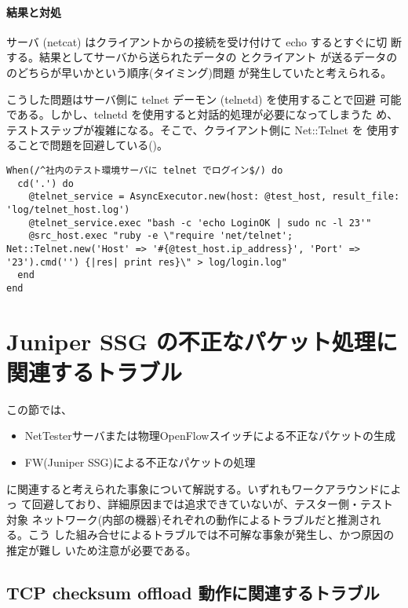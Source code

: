     \paragraph{結果と対処}
サーバ (netcat) はクライアントからの接続を受け付けて echo するとすぐに切
断する。結果としてサーバから送られたデータの  とクライアント
が送るデータの  のどちらが早いかという順序(タイミング)問題
が発生していたと考えられる。

こうした問題はサーバ側に telnet デーモン (telnetd) を使用することで回避
可能である。しかし、telnetd を使用すると対話的処理が必要になってしまうた
め、テストステップが複雑になる。そこで、クライアント側に Net::Telnet を
使用することで問題を回避している()。

\begin{lstlisting}[caption=修正後テストステップ,label=lst:telnet-step-new,linebackgroundcolor={\ifnum\value{lstnumber}=5 \color{green!30}\fi}]
When(/^社内のテスト環境サーバに telnet でログイン$/) do
  cd('.') do
    @telnet_service = AsyncExecutor.new(host: @test_host, result_file: 'log/telnet_host.log')
    @telnet_service.exec "bash -c 'echo LoginOK | sudo nc -l 23'"
    @src_host.exec "ruby -e \"require 'net/telnet'; Net::Telnet.new('Host' => '#{@test_host.ip_address}', 'Port' => '23').cmd('') {|res| print res}\" > log/login.log"
  end
end
\end{lstlisting}

 \section{Juniper SSG の不正なパケット処理に関連するトラブル}
 \label{sec:SSG-troubles}

この節では、
\begin{itemize}
 \item NetTesterサーバまたは物理OpenFlowスイッチによる不正なパケットの生成
 \item FW(Juniper SSG)による不正なパケットの処理
\end{itemize}
に関連すると考えられた事象について解説する。いずれもワークアラウンドによっ
て回避しており、詳細原因までは追求できていないが、テスター側・テスト対象
ネットワーク(内部の機器)それぞれの動作によるトラブルだと推測される。こう
した組み合せによるトラブルでは不可解な事象が発生し、かつ原因の推定が難し
いため注意が必要である。

 \subsection{TCP checksum offload 動作に関連するトラブル}
 \label{sec:tcp-checksum-offload-trouble}

